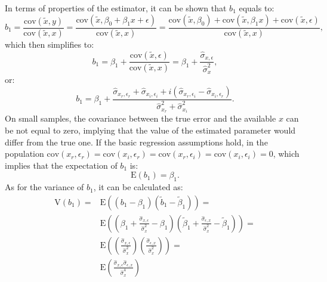 \documentclass[
]{book}
\begin{document}
In terms of properties of the estimator, it can be shown that \(b_1\) equals to:
\begin{equation}
        b_{1} = \frac{\mathrm{cov}(\tilde{x}, y)}{\mathrm{cov}(\tilde{x},x)} = \frac{\mathrm{cov}(\tilde{x}, \beta_0 + \beta_1 x + \epsilon)}{\mathrm{cov}(\tilde{x},x)} = \frac{\mathrm{cov}(\tilde{x}, \beta_0) + \mathrm{cov}(\tilde{x}, \beta_1 x) + \mathrm{cov}(\tilde{x}, \epsilon)}{\mathrm{cov}(\tilde{x},x)},
    \label{eq:SimpleCLROLSb1Value01}
\end{equation}
which then simplifies to:
\begin{equation}
        b_{1} = \beta_1 + \frac{\mathrm{cov}(\tilde{x}, \epsilon)}{\mathrm{cov}(\tilde{x},x)} = \beta_1 + \frac{\hat{\sigma}_{x,\epsilon}}{\hat{\sigma}_x^2} ,
    \label{eq:SimpleCLROLSb1Value02}
\end{equation}
or:
\begin{equation}
        b_{1} = \beta_1 + \frac{\hat{\sigma}_{x_r, \epsilon_r} + \hat{\sigma}_{x_i, \epsilon_i} + i (\hat{\sigma}_{x_r, \epsilon_i} - \hat{\sigma}_{x_i, \epsilon_r})}{\hat{\sigma}_{x_r}^2 + \hat{\sigma}_{x_i}^2} .
    \label{eq:SimpleCLROLSb1Value03}
\end{equation}
On small samples, the covariance between the true error and the available \(x\) can be not equal to zero, implying that the value of the estimated parameter would differ from the true one. If the basic regression assumptions hold, in the population \(\mathrm{cov}(x_r,\epsilon_r)=\mathrm{cov}(x_i,\epsilon_r)=\mathrm{cov}(x_r,\epsilon_i)=\mathrm{cov}(x_i,\epsilon_i)=0\), which implies that the expectation of \(b_1\) is:
\begin{equation}
        \mathrm{E}(b_{1}) = \beta_1 .
    \label{eq:SimpleCLROLSb1Expectation}
\end{equation}
As for the variance of \(b_1\), it can be calculated as:
\begin{equation}
    \begin{aligned}
        \mathrm{V}(b_1) = & \mathrm{E}\left((b_1 - \beta_1)(\tilde{b}_1 - \tilde{\beta}_1)\right) = \\
                          & \mathrm{E}\left((\beta_1 + \frac{\hat{\sigma}_{x,\epsilon}}{\hat{\sigma}_x^2} - \beta_1)(\tilde{\beta}_1 + \frac{\hat{\sigma}_{\epsilon,x}}{\hat{\sigma}_x^2} - \tilde{\beta}_1)\right) = \\
                          & \mathrm{E}\left((\frac{\hat{\sigma}_{x,\epsilon}}{\hat{\sigma}_x^2})(\frac{\hat{\sigma}_{\epsilon,x}}{\hat{\sigma}_x^2})\right) = \\
                          & \mathrm{E}\left(\frac{\hat{\sigma}_{x,\epsilon}\hat{\sigma}_{\epsilon,x}}{\hat{\sigma}_x^4}\right)
    \end{aligned}
    \label{eq:SimpleCLROLSb1Variance}
\end{equation}
\end{document}
